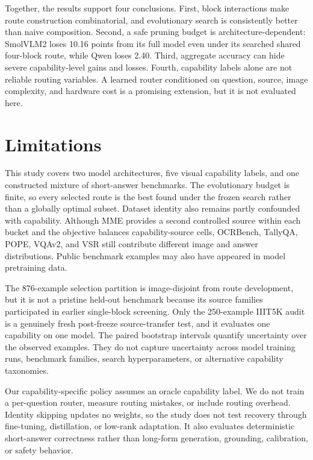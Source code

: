 \documentclass[10pt]{article}
\begin{document}
Together, the results support four conclusions. First, block
interactions make route construction combinatorial, and evolutionary
search is consistently better than naive composition. Second, a safe
pruning budget is architecture-dependent: SmolVLM2 loses 10.16 points
from its full model even under its searched shared four-block route,
while Qwen loses 2.40. Third, aggregate accuracy can hide severe
capability-level gains and losses. Fourth, capability labels alone are
not reliable routing variables. A learned router conditioned on
question, source, image complexity, and hardware cost is a promising
extension, but it is not evaluated here.

\section{Limitations}\label{limitations}

This study covers two model architectures, five visual capability
labels, and one constructed mixture of short-answer benchmarks. The
evolutionary budget is finite, so every selected route is the best found
under the frozen search rather than a globally optimal subset. Dataset
identity also remains partly confounded with capability. Although MME
provides a second controlled source within each bucket and the objective
balances capability-source cells, OCRBench, TallyQA, POPE, VQAv2, and
VSR still contribute different image and answer distributions. Public
benchmark examples may also have appeared in model pretraining data.

The 876-example selection partition is image-disjoint from route
development, but it is not a pristine held-out benchmark because its
source families participated in earlier single-block screening. Only the
250-example IIIT5K audit is a genuinely fresh post-freeze
source-transfer test, and it evaluates one capability on one model. The
paired bootstrap intervals quantify uncertainty over the observed
examples. They do not capture uncertainty across model training runs,
benchmark families, search hyperparameters, or alternative capability
taxonomies.

Our capability-specific policy assumes an oracle capability label. We do
not train a per-question router, measure routing mistakes, or include
routing overhead. Identity skipping updates no weights, so the study
does not test recovery through fine-tuning, distillation, or low-rank
adaptation. It also evaluates deterministic short-answer correctness
rather than long-form generation, grounding, calibration, or safety
behavior.
\end{document}
